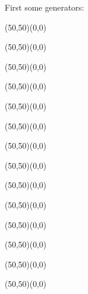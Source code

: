 	First some generators:
	\vspace{1cm}
	\begin{center}
	\begin{picture}(50,50)(0,0)
	\end{picture}
	\begin{picture}(50,50)(0,0)
	\end{picture}
	\begin{picture}(50,50)(0,0)
	\end{picture}
	\begin{picture}(50,50)(0,0)
	\end{picture}
	\begin{picture}(50,50)(0,0)
	\end{picture}
	\begin{picture}(50,50)(0,0)
	\end{picture}
	\begin{picture}(50,50)(0,0)
	\end{picture}
	\end{center}
	
	\begin{center}
	\begin{picture}(50,50)(0,0)
	\end{picture}
	\begin{picture}(50,50)(0,0)
	\end{picture}
	\begin{picture}(50,50)(0,0)
	\end{picture}
	\begin{picture}(50,50)(0,0)
	\end{picture}
	\begin{picture}(50,50)(0,0)
	\end{picture}
	\begin{picture}(50,50)(0,0)
	\end{picture}
	\begin{picture}(50,50)(0,0)
	\end{picture}
	\\[2cm]
	\end{center}
	
